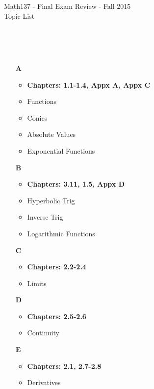 \documentclass{letter}
\begin{document}
	\begin{center}
		\LARGE Math137 - Final Exam Review - Fall 2015\\
		\large Topic List
	\end{center}
	\vspace{0.25 in}
	\hrulefill\\\\\\
	\begin{minipage}[t]{0.5\textwidth}
		\begin{itemize}
			\item[\large \textbf{A}]
			 \begin{itemize}
			 	\item \textbf{Chapters: 1.1-1.4, Appx A, Appx C}
				\item Functions
				\item Conics
				\item Absolute Values
				\item Exponential Functions\\
			\end{itemize}
			\item[\large \textbf{B}]
			\begin{itemize}
				\item \textbf{Chapters: 3.11, 1.5, Appx D}
				\item Hyperbolic Trig
				\item Inverse Trig
				\item Logarithmic Functions\\
			\end{itemize}
			\item[\large \textbf{C}]
			\begin{itemize}
				\item \textbf{Chapters: 2.2-2.4}
				\item Limits\\
			\end{itemize}
			\item[\large \textbf{D}]
			\begin{itemize}
				\item \textbf{Chapters: 2.5-2.6}
				\item Continuity\\
			\end{itemize}
			\item[\large \textbf{E}]
			\begin{itemize}
				\item \textbf{Chapters: 2.1, 2.7-2.8}
				\item Derivatives\\

\end{itemize}
\end{itemize}
\end{minipage}
\end{document}
